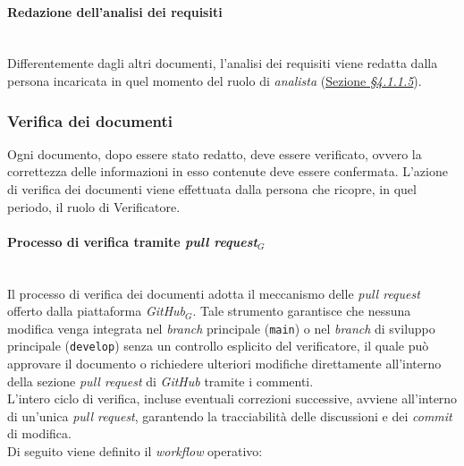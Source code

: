 \documentclass[10pt, letterpaper]{article}
\newcommand{\trisubsection}[1]{\paragraph{#1}\mbox{}\\}
\begin{document}
\trisubsection{Redazione dell'analisi dei requisiti}
Differentemente dagli altri documenti, l'analisi dei requisiti viene redatta dalla persona incaricata in quel momento del ruolo di
\textit{analista} (\hyperref[sec:Analista]{Sezione \textit{§4.1.1.5}}).

\subsubsection{Verifica dei documenti}
Ogni documento, dopo essere stato redatto, deve essere verificato, ovvero la correttezza delle informazioni in esso contenute deve essere confermata.
L'azione di verifica dei documenti viene effettuata dalla persona che ricopre, in quel periodo, il ruolo di Verificatore.

\label{sec:Verifica}
\trisubsection{Processo di verifica tramite \textit{pull request$_G$}}
\label{sec:Verifica_doc}
Il processo di verifica dei documenti adotta il meccanismo delle \textit{pull request} offerto dalla piattaforma \textit{GitHub}${_G}$.
Tale strumento garantisce che nessuna modifica venga integrata nel \textit{branch} principale (\texttt{main}) o nel \textit{branch} di sviluppo principale (\texttt{develop}) senza un controllo esplicito del verificatore,
il quale può approvare il documento o richiedere ulteriori modifiche direttamente all'interno della sezione \textit{pull request} di \textit{GitHub} tramite i commenti. \\
L'intero ciclo di verifica, incluse eventuali correzioni successive, avviene all'interno di un'unica \textit{pull request},
garantendo la tracciabilità delle discussioni e dei \textit{commit} di modifica. \\

Di seguito viene definito il \textit{workflow} operativo:
\end{document}

